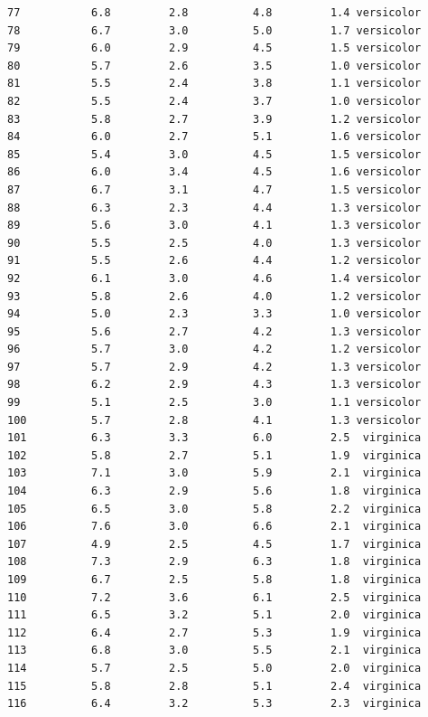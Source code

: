 \documentclass[
  letterpaper,
  DIV=11,
  numbers=noendperiod]{scrreprt}
\begin{document}
\begin{verbatim}
77           6.8         2.8          4.8         1.4 versicolor
78           6.7         3.0          5.0         1.7 versicolor
79           6.0         2.9          4.5         1.5 versicolor
80           5.7         2.6          3.5         1.0 versicolor
81           5.5         2.4          3.8         1.1 versicolor
82           5.5         2.4          3.7         1.0 versicolor
83           5.8         2.7          3.9         1.2 versicolor
84           6.0         2.7          5.1         1.6 versicolor
85           5.4         3.0          4.5         1.5 versicolor
86           6.0         3.4          4.5         1.6 versicolor
87           6.7         3.1          4.7         1.5 versicolor
88           6.3         2.3          4.4         1.3 versicolor
89           5.6         3.0          4.1         1.3 versicolor
90           5.5         2.5          4.0         1.3 versicolor
91           5.5         2.6          4.4         1.2 versicolor
92           6.1         3.0          4.6         1.4 versicolor
93           5.8         2.6          4.0         1.2 versicolor
94           5.0         2.3          3.3         1.0 versicolor
95           5.6         2.7          4.2         1.3 versicolor
96           5.7         3.0          4.2         1.2 versicolor
97           5.7         2.9          4.2         1.3 versicolor
98           6.2         2.9          4.3         1.3 versicolor
99           5.1         2.5          3.0         1.1 versicolor
100          5.7         2.8          4.1         1.3 versicolor
101          6.3         3.3          6.0         2.5  virginica
102          5.8         2.7          5.1         1.9  virginica
103          7.1         3.0          5.9         2.1  virginica
104          6.3         2.9          5.6         1.8  virginica
105          6.5         3.0          5.8         2.2  virginica
106          7.6         3.0          6.6         2.1  virginica
107          4.9         2.5          4.5         1.7  virginica
108          7.3         2.9          6.3         1.8  virginica
109          6.7         2.5          5.8         1.8  virginica
110          7.2         3.6          6.1         2.5  virginica
111          6.5         3.2          5.1         2.0  virginica
112          6.4         2.7          5.3         1.9  virginica
113          6.8         3.0          5.5         2.1  virginica
114          5.7         2.5          5.0         2.0  virginica
115          5.8         2.8          5.1         2.4  virginica
116          6.4         3.2          5.3         2.3  virginica

\end{verbatim}
\end{document}
